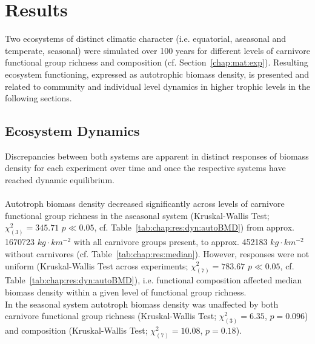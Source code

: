 \chapter{Results}
\label{chap:res}
Two ecosystems of distinct climatic character (i.e. equatorial, aseasonal and temperate, seasonal) were simulated over 100 years for different levels of carnivore functional group richness and composition (cf. Section~\ref{chap:mat:exp}). 
Resulting ecosystem functioning, expressed as autotrophic biomass density, is presented and related to community and individual level dynamics in higher trophic levels in the following sections.
%
\section{Ecosystem Dynamics}
\label{chap:res:dyn} 
Discrepancies between both systems are apparent in distinct responses of biomass density for each experiment over time and once the respective systems have reached dynamic equilibrium.\\\\
Autotroph biomass density decreased significantly across levels of carnivore functional group richness in the aseasonal system (Kruskal-Wallis Test; $\chi^{2}_{(3)} = 345.71$ $p \ll 0.05$, cf. Table~\ref{tab:chap:res:dyn:autoBMD}) from approx. 1670723 $kg\cdot km^{-2}$ with all carnivore groups present, to approx. 452183 $kg\cdot km^{-2}$ without carnivores (cf. Table~\ref{tab:chap:res:median}). 
However, responses were not uniform (Kruskal-Wallis Test across experiments; $\chi^{2}_{(7)} = 783.67$ $p \ll 0.05$, cf. Table~\ref{tab:chap:res:dyn:autoBMD}), i.e. functional composition affected median biomass density within a given level of functional group richness. \\
In the seasonal system autotroph biomass density was unaffected by both carnivore functional group richness (Kruskal-Wallis Test; $\chi^{2}_{(3)} = 6.35$, $p = 0.096$) and composition (Kruskal-Wallis Test; $\chi^{2}_{(7)} = 10.08$, $p = 0.18$).


